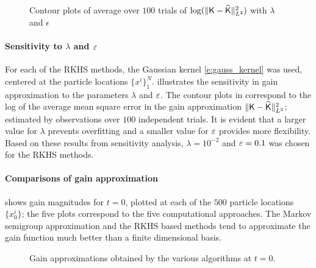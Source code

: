 \begin{figure}[h]
	\centering
	\caption{Contour plots of average over $100$ trials of $\log(\|\text{\sf K} - \widehat{\text{\sf K}}\|^2_{L^2})$ with $\lambda$ and $\epsilon$ }
	\label{fig:log_mse_contour}
\end{figure}

\paragraph*{Sensitivity to $\lambda$ and $\varepsilon$} For each of the RKHS methods, the Gaussian kernel \eqref{e:gauss_kernel} was used, centered at the particle locations $\{x^i\}_1^N$.  illustrates the sensitivity in gain approximation
to the parameters
$\lambda$ and $\varepsilon$. The contour plots in  correspond to the log of the average mean square error in the gain approximation   $\|\text{\sf K} - \widehat{\text{\sf K}} \|^2_{L^2}$;   estimated by observations over $100$ independent trials. It is evident that a larger value for $\lambda$ prevents overfitting and a smaller value for $\varepsilon$ provides more flexibility. Based on these results from sensitivity analysis, $\lambda = 10^{-2}$ and $\varepsilon = 0.1$ was chosen for the RKHS methods.


\paragraph*{Comparisons of gain approximation}
 shows gain magnitudes for $t=0$,  plotted at each of the $500$ particle locations $\{x^i_0\}$; the five plots correspond to the five computational approaches. The Markov semigroup approximation and the RKHS based methods tend to approximate the gain function much better than a finite dimensional basis.


\begin{figure}[h]
	\centering
	\vspace{-0.5em}
	\caption{Gain approximations obtained by the various algorithms at $t=0$.}	\vspace{-0.02in}
	\label{f:gain_comparison}
\end{figure}

